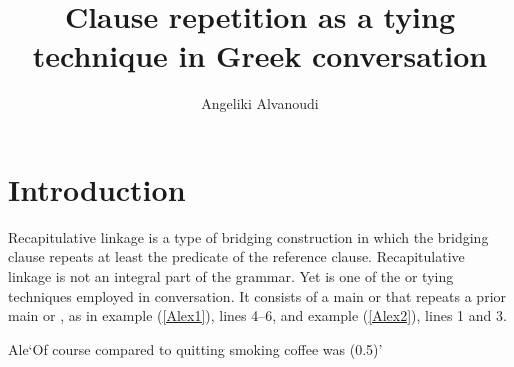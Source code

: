 \documentclass[output=paper]{LSP/langsci}
\author{Angeliki Alvanoudi\affiliation{Aristotle University of Thessaloniki and James Cook University}}
\title{Clause repetition as a tying technique in Greek conversation}
\begin{document}
\label{ch:9}
\section{Introduction} 
\label{AlIntroduction}
Recapitulative linkage is a type of bridging construction in which the bridging clause repeats at least the predicate of the reference clause. Recapitulative linkage is not an integral part of the  grammar. Yet  is one of the  or tying techniques employed in  conversation. It consists of a main or  that repeats a prior main or , as in example (\ref{Alex1}), lines 4--6, and example (\ref{Alex2}), lines 1 and 3.  

\begin{Transcript}{Ale}{‘Of course compared to quitting smoking coffee was (0.5)’}%
\label{Alex1}%
\\
\\
\\
\\    
\\         
\end{Transcript}
\end{document}
